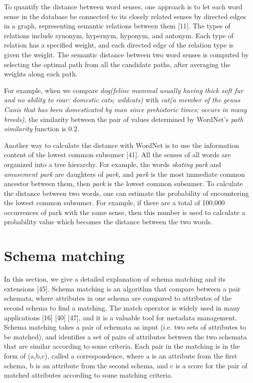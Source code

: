 To quantify the distance between word senses, one approach is to let each word sense in the database be connected to its closely related senses by directed edges in a graph, representing semantic relations between them \cite{cruz2005role}[11]. The types of relations include synonym, hypernym, hyponym, and antonym. Each type of relation has a specified weight, and each directed edge of the relation type is given the weight. The semantic distance between two word senses is computed by selecting the optimal path from all the candidate paths, after averaging the weights along each path.

For example, when we compare \textit{dog(feline mammal usually having thick soft fur and no ability to roar: domestic cats; wildcats)} with \textit{cat(a member of the genus Canis that has been domesticated by man since prehistoric times; occurs in many breeds)}, the similarity between the pair of values determined by WordNet's \textit{path similarity} function is 0.2.

Another way to calculate the distance with WordNet is to use the information content of the lowest common subsumer \cite{Resnik1970Using}[41]. All the senses of all words are organized into a tree hierarchy. For example, the words \textit{skating park} and \textit{amusement park} are daughters of \textit{park}, and \textit{park} is the most immediate common ancestor between them, then \textit{park} is the lowest common subsumer. To calculate the distance between two words, one can estimate the probability of encountering the lowest common subsumer. For example, if there are a total of 100,000 occurrences of park with the same sense, then this number is used to calculate a probability value which becomes the distance between the two words.

\section{Schema matching}
\label{sec:SchemaMatching}

In this section, we give a detailed explanation of schema matching and its extensions \cite{Sorrentino2011NORMS}[45]. Schema matching is an algorithm that compare between a pair schemata, where attributes in one schema are compared to attributes of the second schema to find a matching. The match operator is widely used in many applications \cite{Dong2012Proceedings}[16] \cite{Rahm2001Survey}[40] \cite{10.1145/3183713.3183729}[47], and it is a valuable tool for metadata management. Schema matching takes a pair of schemata as input (i.e. two sets of attributes to be matched), and identifies a set of pairs of attributes between the two schemata that are similar according to some criteria. Each pair in the matching is in the form of (a,b,c), called a correspondence, where a is an attribute from the first schema, b is an attribute from the second schema, and c is a score for the pair of matched attributes according to some matching criteria.

